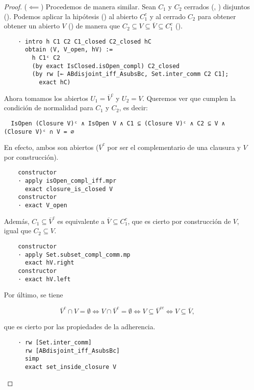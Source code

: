 \begin{proof}
  ($\impliedby$) Procedemos de manera similar. Sean $C_1$ y $C_2$ cerrados (, ) disjuntos (). Podemos aplicar la hipótesis () al abierto $C_1^c$ y al cerrado $C_2$ para obtener obtener un abierto $V$ () de manera que $C_2 \subseteq V \subseteq \overline{V} \subseteq C_1^c$ ().

\begin{lstlisting}
    · intro h C1 C2 C1_closed C2_closed hC
      obtain ⟨V, V_open, hV⟩ :=
        h C1ᶜ C2
        (by exact IsClosed.isOpen_compl) C2_closed
        (by rw [← ABdisjoint_iff_AsubsBc, Set.inter_comm C2 C1];
          exact hC)
\end{lstlisting}

  Ahora tomamos los abiertos $U_1 = \overline{V}^c$ y $U_2 = V$. Queremos ver que cumplen la condición de normalidad para $C_1$ y $C_2$, es decir:
  
\begin{lstlisting}
  IsOpen (Closure V)ᶜ ∧ IsOpen V ∧ C1 ⊆ (Closure V)ᶜ ∧ C2 ⊆ V ∧ (Closure V)ᶜ ∩ V = ∅
\end{lstlisting}
  
  En efecto, ambos son abiertos ($\overline{V}^c$ por ser el complementario de una clausura y $V$ por construcción).

\begin{lstlisting}
    constructor
    · apply isOpen_compl_iff.mpr
      exact closure_is_closed V
    constructor
    · exact V_open
\end{lstlisting}

  Además, $C_1 \subseteq \overline{V}^c$ es equivalente a $\overline{V} \subseteq C_1^c$, que es cierto por construcción de $V$, igual que $C_2 \subseteq V$.
  
\begin{lstlisting}
    constructor
    · apply Set.subset_compl_comm.mp
      exact hV.right
    constructor
    · exact hV.left
\end{lstlisting}

  Por último, se tiene

  $$
  \overline{V}^c \cap V = \emptyset \iff V \cap \overline{V}^c = \emptyset \iff
  V \subseteq \overline{V}^{cc} \iff V \subseteq \overline{V},
  $$

  que es cierto por las propiedades de la adherencia.

\begin{lstlisting}
    · rw [Set.inter_comm]
      rw [ABdisjoint_iff_AsubsBc]
      simp
      exact set_inside_closure V
\end{lstlisting}


\end{proof}